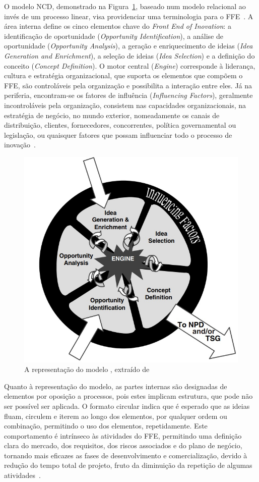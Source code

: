 O modelo \gls{NCD}, demonstrado na Figura~\ref{fig:ncd_model}, baseado num modelo relacional ao invés de um processo linear, visa providenciar uma terminologia para o \gls{FFE}~\parencite{ffe_effectivemethods_tools_techniques}. A área interna define os cinco elementos chave do \textit{Front End of Inovation}: a identificação de oportunidade (\textit{Opportunity Identification}), a análise de oportunidade (\textit{Opportunity Analysis}), a geração e enriquecimento de ideias (\textit{Idea Generation and Enrichment}), a seleção de ideias (\textit{Idea Selection}) e a definição do conceito (\textit{Concept Definition}). O motor central (\textit{Engine}) corresponde à liderança, cultura e estratégia organizacional, que suporta os elementos que compõem o \gls{FFE}, são controláveis pela organização e possibilita a interação entre eles. Já na periferia, encontram-se os fatores de influência (\textit{Influencing Factors}), geralmente incontroláveis pela organização, consistem nas capacidades organizacionais, na estratégia de negócio, no mundo exterior, nomeadamente os canais de distribuição, clientes, fornecedores, concorrentes, política governamental ou legislação, ou quaisquer fatores que possam influenciar todo o processo de inovação~\parencite{ffe_effectivemethods_tools_techniques, providing_clarity_common_language_ffe}.

\begin{figure}[!ht]
    \centering
    \includegraphics[width=.55\textwidth]{ch2/assets/ncd_model.jpg}
    \caption{A representação do modelo , extraído de~\textcite{ffe_effectivemethods_tools_techniques}}
    \label{fig:ncd_model}
\end{figure}

Quanto à representação do modelo, as partes internas são designadas de elementos por oposição a processos, pois estes implicam estrutura, que pode não ser possível ser aplicada. O formato circular indica que é esperado que as ideias fluam, circulem e iterem ao longo dos elementos, por qualquer ordem ou combinação, permitindo o uso dos elementos, repetidamente. Este comportamento é intrínseco às atividades do \gls{FFE}, permitindo uma definição clara do mercado, dos requisitos, dos riscos associados e do plano de negócio, tornando mais eficazes as fases de desenvolvimento e comercialização, devido à redução do tempo total de projeto, fruto da diminuição da repetição de algumas atividades~\parencite{ffe_effectivemethods_tools_techniques}. 

